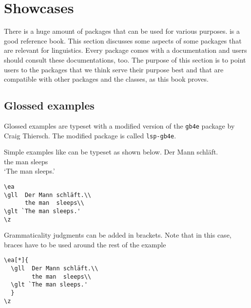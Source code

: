 \chapter{Showcases}

There is a huge amount of packages that can be used for various purposes.  is a good
reference book. This section discusses some aspects of some packages that are relevant for
linguistics. Every \latex package comes with a documentation and users should consult these
documentations, too. The purpose of this section is to point users to the packages that we think
serve their purpose best and that are compatible with other packages and the \lsp classes, as this
book proves.

\section{Glossed examples}

Glossed examples are typeset with a modified version of the \texttt{gb4e} package by Craig
Thiersch. The modified package is called \texttt{lsp-gb4e}. 

Simple examples like  can be typeset as shown below.
\ea\label{ex:showcases:simple}
\gll Der Mann schläft.\\
     the man  sleeps\\
\glt `The man sleeps.'
\z
\begin{verbatim}
\ea
\gll  Der Mann schläft.\\
      the man  sleeps\\
\glt `The man sleeps.'
\z
\end{verbatim}

Grammaticality judgments can be added in brackets. Note that in this case, braces have to be used around the rest of the example
\z
\begin{verbatim}
\ea[*]{
  \gll  Der Mann schläft.\\
        the man  sleeps\\
  \glt `The man sleeps.'
  }
\z
\end{verbatim}

